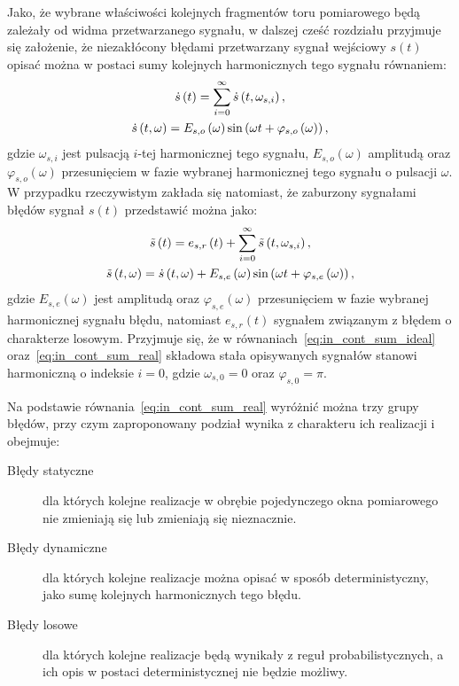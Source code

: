 Jako, że wybrane właściwości kolejnych fragmentów toru pomiarowego będą zależały od widma przetwarzanego sygnału, w dalszej cześć rozdziału przyjmuje się założenie, że niezakłócony błędami przetwarzany sygnał wejściowy $s(t)$ opisać można w postaci sumy kolejnych harmonicznych tego sygnału równaniem:
\begin{gather}
\dot{s} \left(t\right) = \sum _{i = 0} ^{\infty} \dot{s} \left( t, \omega_{s,i} \right) \label{eq:in_cont_sum_ideal}, \\
\dot{s} \left( t, \omega \right) = E_{s,o} \left(\omega\right) \sin \left( \omega t + \varphi_{s,o} \left(\omega\right) \right) \label{eq:in_cont_omega_ideal},
\end{gather}
gdzie $\omega_{s,i}$ jest pulsacją $i$-tej harmonicznej tego sygnału, $E_{s,o}(\omega)$ amplitudą oraz $\varphi_{s,o}(\omega)$ przesunięciem w fazie wybranej harmonicznej tego sygnału o pulsacji $\omega$. W przypadku rzeczywistym zakłada się natomiast, że zaburzony sygnałami błędów sygnał $s(t)$ przedstawić można jako:
\begin{gather}
\tilde{s} \left(t\right) = e_{s,r} \left(t\right) + \sum _{i = 0} ^{\infty} \tilde{s} \left( t, \omega_{s,i} \right) \label{eq:in_cont_sum_real}, \\
\tilde{s} \left( t, \omega \right) = \dot{s} \left( t, \omega \right) + E_{s,e} \left(\omega\right) \sin \left( \omega t + \varphi_{s,e} \left(\omega\right) \right) \label{eq:in_cont_omega_real},
\end{gather}
gdzie $E_{s,e}(\omega)$ jest amplitudą oraz $ \varphi_{s,e}(\omega)$ przesunięciem w fazie wybranej harmonicznej sygnału błędu, natomiast $e_{s,r}(t)$ sygnałem związanym z błędem o charakterze losowym. Przyjmuje się, że w równaniach~\eqref{eq:in_cont_sum_ideal} oraz~\eqref{eq:in_cont_sum_real} składowa stała opisywanych sygnałów stanowi harmoniczną o indeksie $i = 0$, gdzie $\omega_{s,0} = 0$ oraz $\varphi_{s,0} = \pi$.

Na podstawie równania~\eqref{eq:in_cont_sum_real} wyróżnić można trzy grupy błędów, przy czym zaproponowany podział wynika z charakteru ich realizacji i obejmuje:
\begin{description}
\item [Błędy statyczne] dla których kolejne realizacje w obrębie pojedynczego okna pomiarowego nie zmieniają się lub zmieniają się nieznacznie.
\item [Błędy dynamiczne] dla których kolejne realizacje można opisać w sposób deterministyczny, jako sumę kolejnych harmonicznych tego błędu.
\item [Błędy losowe] dla których kolejne realizacje będą wynikały z reguł probabilistycznych, a ich opis w postaci deterministycznej nie będzie możliwy.
\end{description}

